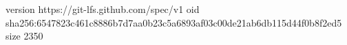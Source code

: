 version https://git-lfs.github.com/spec/v1
oid sha256:6547823c461c8886b7d7aa0b23c5a6893af03c00de21ab6db115d44f0b8f2ed5
size 2350
